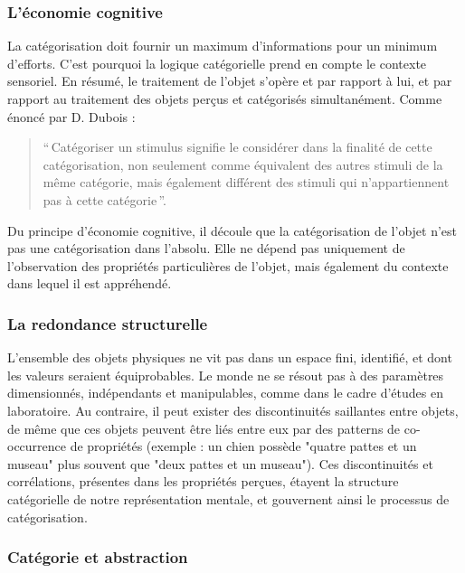 \subsubsection{L'économie cognitive}

La catégorisation doit fournir un maximum d'informations pour un minimum d'efforts. C'est pourquoi la logique catégorielle prend en compte le contexte sensoriel. En résumé, le traitement de l'objet s'opère et par rapport à lui, et par rapport au traitement des objets perçus et catégorisés simultanément. Comme énoncé par D. Dubois \citep[p. 33]{dubois1991semantique}:

\begin{quote}
``\,Catégoriser un stimulus signifie le considérer dans la finalité de cette catégorisation, non seulement comme équivalent des autres stimuli de la même catégorie, mais également différent des stimuli qui n'appartiennent pas à cette catégorie\,''.
\end{quote}

Du principe d'économie cognitive, il découle que la catégorisation de l'objet n'est pas une catégorisation dans l'absolu. Elle ne dépend pas uniquement de l'observation des propriétés particulières de l'objet, mais également du contexte dans lequel il est appréhendé.

\subsubsection{La redondance structurelle}

L'ensemble des objets physiques ne vit pas dans un espace fini, identifié, et dont les valeurs seraient équiprobables. Le monde ne se résout pas à des paramètres dimensionnés, indépendants et manipulables, comme dans le cadre d'études en laboratoire. Au contraire, il peut exister des discontinuités saillantes entre objets, de même que ces objets peuvent être liés entre eux par des patterns de co-occurrence de propriétés (exemple : un chien possède "quatre pattes et un museau" plus souvent que "deux pattes et un museau"). Ces discontinuités et corrélations, présentes dans les propriétés perçues, étayent la structure catégorielle de notre représentation mentale, et gouvernent ainsi le processus de catégorisation.
 
\subsubsection{Catégorie et abstraction}
 \label{sec:ch3_categoEtAbstract}
 
